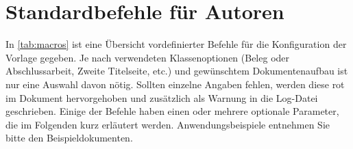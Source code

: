 	
	
	\section{Standardbefehle für Autoren}
	\label{sec:macros}
	
	In \cref{tab:macros} ist eine Übersicht vordefinierter Befehle für die Konfiguration der Vorlage gegeben.
	Je nach verwendeten Klassenoptionen (Beleg oder Abschlussarbeit, Zweite Titelseite, etc.) und gewünschtem Dokumentenaufbau ist nur eine Auswahl davon nötig.
	Sollten einzelne Angaben fehlen, werden diese rot im Dokument hervorgehoben und zusätzlich als Warnung in die Log-Datei geschrieben.
	Einige der Befehle haben einen oder mehrere optionale Parameter, die im Folgenden kurz erläutert werden.
	Anwendungsbeispiele entnehmen Sie bitte den Beispieldokumenten.
	
